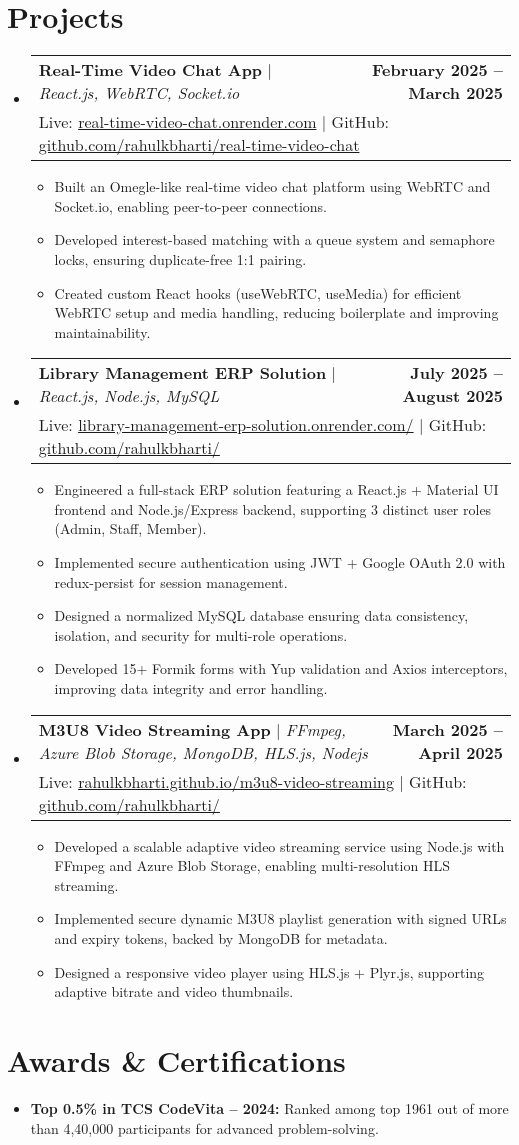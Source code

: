 \documentclass[a4paper,11pt]{article}
\makeatletter
\newcommand{\resumeItem}[1]{\item\small{{#1 \vspace{-2pt}}}}
\newcommand{\resumeProjectHeading}[3]{
    \item
    \begin{tabular*}{\textwidth}{l@{\extracolsep{\fill}}r}
        \small #1 & \textbf{\small #2} \\%
        \multicolumn{2}{l}{\small #3}%
    \end{tabular*}\vspace{-6pt}
}
\newcommand{\resumeItemListStart}{\begin{itemize}}
\newcommand{\resumeItemListEnd}{\end{itemize}\vspace{-5pt}}
\newcommand{\resumeSubHeadingListStart}{\begin{itemize}[leftmargin=0.0in, label={}]}
\newcommand{\resumeSubHeadingListEnd}{\end{itemize}}
\makeatother
\begin{document}
\section{Projects}
\resumeSubHeadingListStart
  \resumeProjectHeading
      {\textbf{Real-Time Video Chat App } $|$ \emph{React.js, WebRTC, Socket.io}}{February 2025 -- March 2025}
      {Live: \href{https://real-time-video-chat.onrender.com/}{real-time-video-chat.onrender.com} $|$ 
      GitHub: \href{https://github.com/rahulkbharti/real-time-video-chat}{github.com/rahulkbharti/real-time-video-chat}} 
      \resumeItemListStart
         \resumeItem{Built an Omegle-like real-time video chat platform using WebRTC and Socket.io, enabling peer-to-peer connections.}
         \resumeItem{Developed interest-based matching with a queue system and semaphore locks, ensuring duplicate-free 1:1 pairing.}
         \resumeItem{Created custom React hooks (useWebRTC, useMedia) for efficient WebRTC setup and media handling, reducing boilerplate and improving maintainability.}    
      \resumeItemListEnd
   \resumeProjectHeading
      {\textbf{Library Management ERP Solution } $|$ \emph{React.js, Node.js, MySQL}}{July 2025 -- August 2025}
      {Live: \href{https://library-management-erp-solution.onrender.com/}{library-management-erp-solution.onrender.com/} $|$ GitHub: \href{https://github.com/rahulkbharti/}{github.com/rahulkbharti/}} 
      \resumeItemListStart
         \resumeItem{Engineered a full-stack ERP solution featuring a React.js + Material UI frontend and Node.js/Express backend, supporting 3 distinct user roles (Admin, Staff, Member).}
         \resumeItem{Implemented secure authentication using JWT + Google OAuth 2.0 with redux-persist for session management.}
         \resumeItem{Designed a normalized MySQL database ensuring data consistency, isolation, and security for multi-role operations.}
         \resumeItem{Developed 15+ Formik forms with Yup validation and Axios interceptors, improving data integrity and error handling.}
      \resumeItemListEnd
      
   \resumeProjectHeading
      {\textbf{M3U8 Video Streaming App} $|$ \emph{FFmpeg, Azure Blob Storage, MongoDB, HLS.js, Nodejs}}{March 2025 -- April 2025}
      {Live: \href{https://rahulkbharti.github.io/m3u8-video-streaming}{rahulkbharti.github.io/m3u8-video-streaming} $|$ GitHub: \href{https://github.com/rahulkbharti/}{github.com/rahulkbharti/}} 
      \resumeItemListStart
         \resumeItem{Developed a scalable adaptive video streaming service using Node.js with FFmpeg and Azure Blob Storage, enabling multi-resolution HLS streaming.}
         \resumeItem{Implemented secure dynamic M3U8 playlist generation with signed URLs and expiry tokens, backed by MongoDB for metadata.}
         \resumeItem{Designed a responsive video player using HLS.js + Plyr.js, supporting adaptive bitrate and video thumbnails.}
      \resumeItemListEnd
\resumeSubHeadingListEnd

\section{Awards \& Certifications}
\resumeItemListStart

  \resumeItem{\textbf{Top 0.5\% in TCS CodeVita – 2024:} Ranked among top 1961 out of more than 4,40,000 participants for advanced problem-solving.}

\resumeItemListEnd
\end{document}
